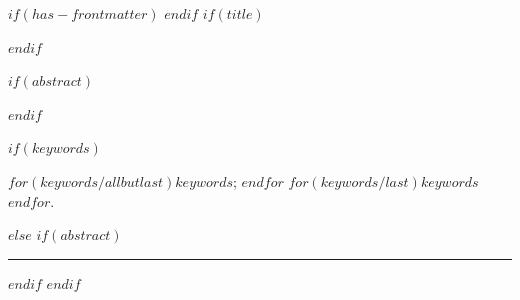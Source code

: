 $if(has-frontmatter)$
\frontmatter
$endif$
$if(title)$
\maketitle
$endif$

$if(abstract)$
\begin{abstract}
$abstract$
\end{abstract}
$endif$

$if(keywords)$
\begin{keywords}
  $for(keywords/allbutlast)$$keywords$; $endfor$
  $for(keywords/last)$$keywords$$endfor$.
\end{keywords}
$else$
  $if(abstract)$
  \vspace{0.25cm}\par\hrule\vspace{0.5cm}\par
  $endif$
$endif$
